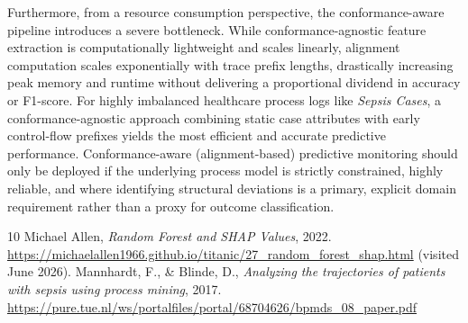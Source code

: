 \documentclass[12pt,a4paper]{article}
\begin{document}
Furthermore, from a resource consumption perspective, the conformance-aware pipeline introduces a severe bottleneck. While conformance-agnostic feature extraction is computationally lightweight and scales linearly, alignment computation scales exponentially with trace prefix lengths, drastically increasing peak memory and runtime without delivering a proportional dividend in accuracy or F1-score.
For highly imbalanced healthcare process logs like \textit{Sepsis Cases}, a conformance-agnostic approach combining static case attributes with early control-flow prefixes yields the most efficient and accurate predictive performance. Conformance-aware (alignment-based) predictive monitoring should only be deployed if the underlying process model is strictly constrained, highly reliable, and where identifying structural deviations is a primary, explicit domain requirement rather than a proxy for outcome classification.

\begin{thebibliography}{10}
Michael Allen, \textit{Random Forest and SHAP Values}, 2022.
\url{https://michaelallen1966.github.io/titanic/27_random_forest_shap.html} (visited June 2026).
Mannhardt, F., \& Blinde, D., \textit{Analyzing the trajectories of patients with sepsis using process mining}, 2017.
\url{https://pure.tue.nl/ws/portalfiles/portal/68704626/bpmds_08_paper.pdf}
\end{thebibliography}
\end{document}
